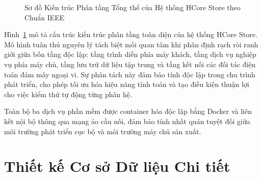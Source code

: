 \begin{figure}[htbp]
\caption{Sơ đồ Kiến trúc Phân tầng Tổng thể của Hệ thống HCore Store theo Chuẩn IEEE}
\label{fig:overall_architecture}
\end{figure}

Hình~\ref{fig:overall_architecture} mô tả cấu trúc kiến trúc phân tầng toàn diện của hệ thống HCore Store. Mô hình tuân thủ nguyên lý tách biệt mối quan tâm khi phân định rạch ròi ranh giới giữa bốn tầng độc lập: tầng trình diễn phía máy khách, tầng dịch vụ nghiệp vụ phía máy chủ, tầng lưu trữ dữ liệu tập trung và tầng kết nối các đối tác điện toán đám mây ngoại vi. Sự phân tách này đảm bảo tính độc lập trong chu trình phát triển, cho phép tối ưu hóa hiệu năng tính toán và tạo điều kiện thuận lợi cho việc kiểm thử tự động từng phân hệ.

Toàn bộ ba dịch vụ phần mềm được container hóa độc lập bằng Docker và liên kết nội bộ thông qua mạng ảo cầu nối, đảm bảo tính nhất quán tuyệt đối giữa môi trường phát triển cục bộ và môi trường máy chủ sản xuất.

\section{Thiết kế Cơ sở Dữ liệu Chi tiết}
